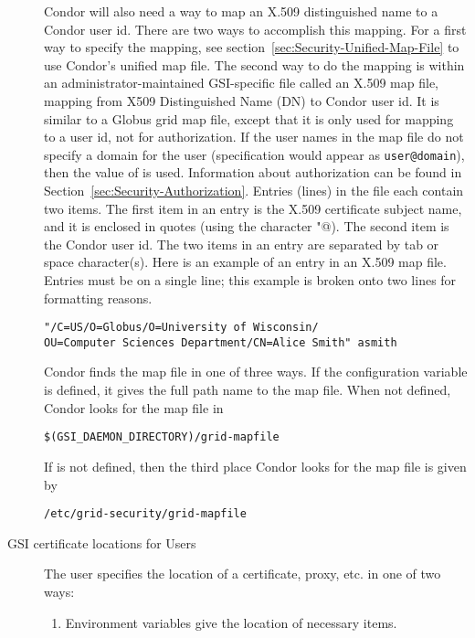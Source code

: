 \begin{description}
Condor will also need a way to map an X.509 distinguished
name to a Condor user id.
There are two ways to accomplish this mapping.
For a first way to specify the mapping, see
section~\ref{sec:Security-Unified-Map-File}
to use Condor's unified map file.
The second way to do the mapping is within
an administrator-maintained GSI-specific file called an X.509 map file,
mapping from X509 Distinguished Name (DN) to Condor user id.
It is similar to a Globus grid map file, except that it is only used for
mapping to a user id, not for authorization. 
If the user names in the
map file do not specify a domain for the user
(specification would appear as \verb|user@domain|),
then the value of  is used.
Information about authorization can be found in
Section~\ref{sec:Security-Authorization}. 
Entries (lines) in the file each contain two items.
The first item in an entry is the 
X.509 certificate subject name, and it is enclosed in quotes
(using the character \verb@"@).
The second item is the Condor user id.
The two items in an entry are separated by tab or space character(s).
Here is an example of an entry in an X.509 map file.
Entries must be on a single line; this example is broken
onto two lines for formatting reasons.

\footnotesize
\begin{verbatim}
"/C=US/O=Globus/O=University of Wisconsin/
OU=Computer Sciences Department/CN=Alice Smith" asmith
\end{verbatim}
\normalsize

Condor finds the map file in one of three ways.
If the configuration variable  is defined,
it gives the full path name to the map file.
When not defined,
Condor looks for the map file in 
\begin{verbatim}
$(GSI_DAEMON_DIRECTORY)/grid-mapfile
\end{verbatim}
If  is not defined,
then the third place Condor looks for the map file is given by
\begin{verbatim}
/etc/grid-security/grid-mapfile
\end{verbatim}


\item[GSI certificate locations for Users]

The user specifies the location of a certificate, proxy, etc.
in one of two ways:
\begin{enumerate}
\item
Environment variables give the location of necessary items.


\end{enumerate}
\end{description}
